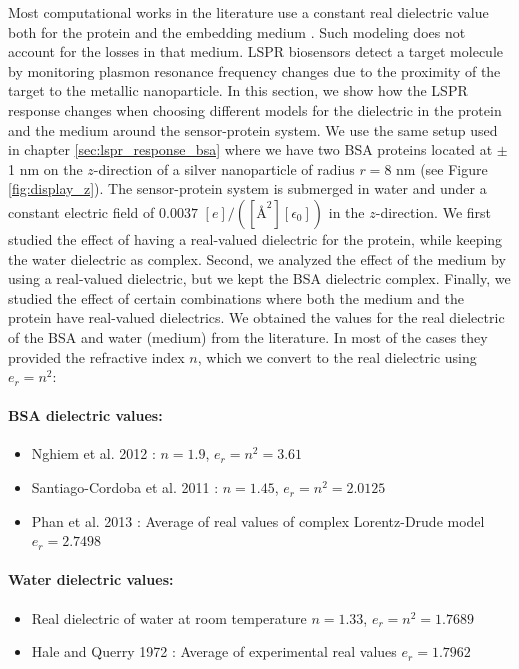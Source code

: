 Most computational works in the literature use a constant real dielectric value both for the protein and the
embedding medium \cite{NghiemETal2012, SantiagoCordobaETal2011,UngerETal2009}. Such modeling does not account for the losses 
in that medium. LSPR biosensors detect a target molecule by monitoring plasmon resonance frequency changes due to the proximity 
of the target to the metallic nanoparticle. In this section, we show how the LSPR response changes when choosing different models 
for the dielectric in the protein and the medium around the sensor-protein system. We use the same setup used in chapter \ref{sec:lspr_response_bsa}
where we have two BSA proteins located at $\pm$ 1 nm on the $z$-direction of a silver nanoparticle of radius $r=8$ nm (see 
Figure \ref{fig:display_z}). The sensor-protein system is submerged in water and under a constant electric field of 
$0.0037$ $[e]/([{\text{\AA}}^2][\epsilon_0])$ in the $z$-direction. We first studied the effect of having a real-valued dielectric 
for the protein, while keeping the water dielectric as complex. Second, we analyzed the effect of the medium by using a real-valued 
dielectric, but we kept the BSA dielectric complex. Finally, we studied the effect of certain combinations where both the medium 
and the protein have real-valued dielectrics. We obtained the values for the real dielectric of the BSA and water (medium) from the literature.
In most of the cases they provided the refractive index $n$, which we convert to the real dielectric using $e_r=n^2$:  

\paragraph{BSA dielectric values:}
\begin{itemize}
    \item {Nghiem et al. 2012 \cite{NghiemETal2012}: $n=1.9$, $e_r = n^2 = 3.61$}
    \item {Santiago-Cordoba et al. 2011 \cite{SantiagoCordobaETal2011}: $n=1.45$, $e_r = n^2 = 2.0125$}
    \item {Phan et al. 2013 \cite{PhanETal2013}: Average of real values of complex Lorentz-Drude model $e_r = 2.7498$}
\end{itemize}

\paragraph{Water dielectric values:}
\begin{itemize}
    \item {Real dielectric of water at room temperature $n=1.33$, $e_r = n^2 = 1.7689$}
    \item {Hale and Querry 1972 \cite{HaleQuerry1972}: Average of experimental real values $e_r = 1.7962$}
\end{itemize}
  
